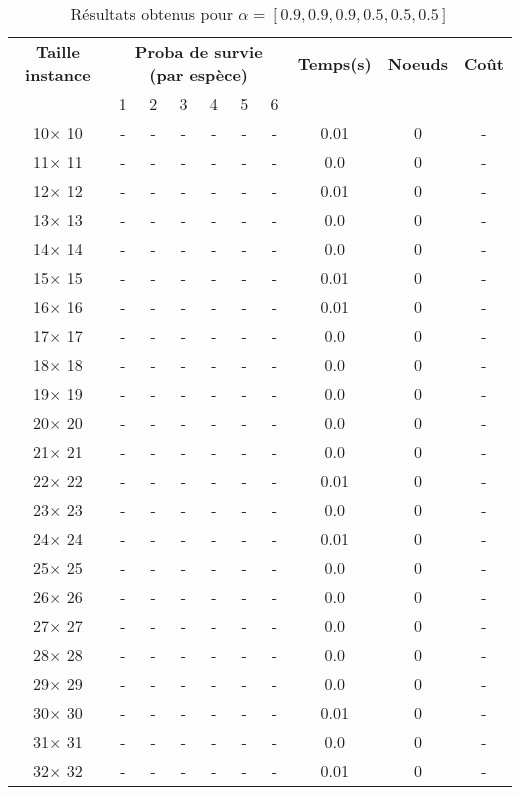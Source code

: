 \documentclass[main.tex]{subfiles}
\begin{document}
\begin{table}
\centering
\caption{Résultats obtenus pour $\alpha = [0.9, 0.9, 0.9, 0.5, 0.5, 0.5]$}
\begin{tabular}{|c||c|c|c|c|c|c||c|c|c|}
\hline
\textbf{Taille instance}&\multicolumn{6}{c}{\textbf{Proba de survie (par espèce)}}&\textbf{Temps(s)}&\textbf{Noeuds}&\textbf{Coût}\\
&1&2&3&4&5&6& & &\\
\hline

10$\times$ 10 & - & - & - & - & - & - &0.01 &0 &-\\
11$\times$ 11 & - & - & - & - & - & - &0.0 &0 &-\\
12$\times$ 12 & - & - & - & - & - & - &0.01 &0 &-\\
13$\times$ 13 & - & - & - & - & - & - &0.0 &0 &-\\
14$\times$ 14 & - & - & - & - & - & - &0.0 &0 &-\\
15$\times$ 15 & - & - & - & - & - & - &0.01 &0 &-\\
16$\times$ 16 & - & - & - & - & - & - &0.01 &0 &-\\
17$\times$ 17 & - & - & - & - & - & - &0.0 &0 &-\\
18$\times$ 18 & - & - & - & - & - & - &0.0 &0 &-\\
19$\times$ 19 & - & - & - & - & - & - &0.0 &0 &-\\
20$\times$ 20 & - & - & - & - & - & - &0.0 &0 &-\\
21$\times$ 21 & - & - & - & - & - & - &0.0 &0 &-\\
22$\times$ 22 & - & - & - & - & - & - &0.01 &0 &-\\
23$\times$ 23 & - & - & - & - & - & - &0.0 &0 &-\\
24$\times$ 24 & - & - & - & - & - & - &0.01 &0 &-\\
25$\times$ 25 & - & - & - & - & - & - &0.0 &0 &-\\
26$\times$ 26 & - & - & - & - & - & - &0.0 &0 &-\\
27$\times$ 27 & - & - & - & - & - & - &0.0 &0 &-\\
28$\times$ 28 & - & - & - & - & - & - &0.0 &0 &-\\
29$\times$ 29 & - & - & - & - & - & - &0.0 &0 &-\\
30$\times$ 30 & - & - & - & - & - & - &0.01 &0 &-\\
31$\times$ 31 & - & - & - & - & - & - &0.0 &0 &-\\
32$\times$ 32 & - & - & - & - & - & - &0.01 &0 &-\\

\end{tabular}
\end{table}
\end{document}
